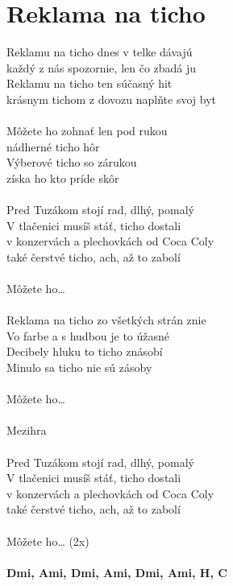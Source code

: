 \section{Reklama na ticho}
Reklamu na ticho dnes v telke dávajú\\
každý z nás spozornie, len čo zbadá ju\\
Reklamu na ticho ten súčasný hit\\
krásnym tichom z dovozu naplňte svoj byt\\
\\
Môžete ho zohnať len pod rukou\\
nádherné ticho hôr\\
Výberové ticho so zárukou\\
získa ho kto príde skôr\\
\\
Pred Tuzákom stojí rad, dlhý, pomalý\\
V tlačenici musíš stáť, ticho dostali\\
v konzervách a plechovkách od Coca Coly\\
také čerstvé ticho, ach, až to zabolí\\
\\
Môžete ho…\\
\\
Reklama na ticho zo všetkých strán znie\\
Vo farbe a s hudbou je to úžasné\\
Decibely hluku to ticho znásobí\\
Minulo sa ticho nie sú zásoby\\
\\
Môžete ho…\\
\\
Mezihra\\
\\
Pred Tuzákom stojí rad, dlhý, pomalý\\
V tlačenici musíš stáť, ticho dostali\\
v konzervách a plechovkách od Coca Coly\\
také čerstvé ticho, ach, až to zabolí\\
\\
Môžete ho… (2x)\\
\\
\footnotesize\textbf{D\kr mi, A\kr mi, D\kr mi, A\kr mi, D\kr mi, A\kr mi, H, C\kr}
\normalsize